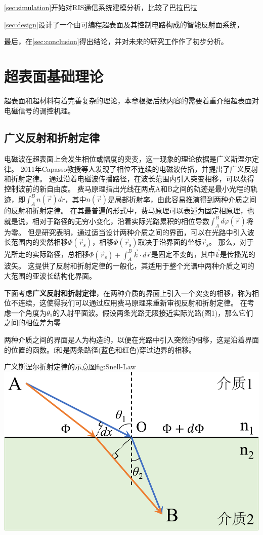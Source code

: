 \documentclass[supercite]{HustGraduPaper}
\begin{document}
\autoref{sec:simulation}开始对RIS通信系统建模分析，比较了巴拉巴拉

\autoref{sec:design}设计了一个由可编程超表面及其控制电路构成的智能反射面系统，

最后，在\autoref{sec:conclusion}得出结论，并对未来的研究工作作了初步分析。

\section{超表面基础理论}\label{sec:theory}

超表面和超材料有着完善复杂的理论，本章根据后续内容的需要着重介绍超表面对电磁信号的调控机理。

\subsection{广义反射和折射定律}

电磁波在超表面上会发生相位或幅度的突变，这一现象的理论依据是广义斯涅尔定律\cite{9326394}。
2011年Capasso教授等人发现了相位不连续的电磁波传播，并提出了广义反射和折射定律\cite{yu2011light}。
通过沿着电磁波传播路径，在波长范围内引入突变相移，可以获得控制波前的新自由度。
费马原理指出光线在两点A和B之间的轨迹是最小光程的轨迹，即$ \int_{A}^{B} n(\vec{r}) dr $，其中$ n(\vec{r}) $是局部折射率，由此容易推演得到两种介质之间的反射和折射定律。
在其最普遍的形式中，费马原理可以表述为固定相原理\cite{feynman2010quantum}，也就是说，相对于路径的无穷小变化，沿着实际光路累积的相位导数$ \int_{A}^{B} d \varphi (\vec{r}) $将为零。
但是研究表明，通过适当设计两种介质之间的界面，可以在光路中引入波长范围内的突然相移$ \Phi (\vec{r}_\mathrm{s}) $，相移$ \Phi (\vec{r}_\mathrm{s}) $取决于沿界面的坐标$ \vec{r}_\mathrm{s} $。
那么，对于光所走的实际路径，总相移$ \Phi\left(\vec{r}_{\mathrm{s}}\right)+\int_{A}^{B} \vec{k} \cdot d \vec{r} $是固定不变的，其中$ \vec{k} $是传播光的波矢。
这提供了反射和折射定律的一般化，其适用于整个光谱中两种介质之间的大范围的亚波长结构化界面。

下面考虑{\bfseries 广义反射和折射定律}，在两种介质的界面上引入一个突变的相移，称为相位不连续，这使得我们可以通过应用费马原理来重新审视反射和折射定律。
在考虑一个角度为$\theta_1$的入射平面波。假设两条光路无限接近实际光路(图1)，那么它们之间的相位差为零

两种介质之间的界面是人为构造的，以便在光路中引入突然的相移，这是沿着界面的位置的函数。f和是两条路径(蓝色和红色)穿过边界的相移。

\begin{generalfig}[htb]{广义斯涅尔折射定律的示意图}{fig:Snell-Law}
	\includegraphics[width=0.5\linewidth]{Figures/Snell-Law.pdf}
\end{generalfig}
\end{document}
